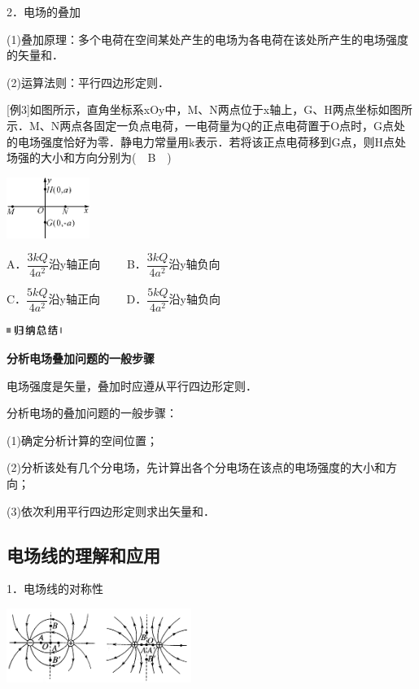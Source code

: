 \documentclass[cn,10.5pt,chinese,mac,chinesefont=founder]{elegantbook}
\begin{document}
2．电场的叠加

(1)叠加原理：多个电荷在空间某处产生的电场为各电荷在该处所产生的电场强度的矢量和．

(2)运算法则：平行四边形定则．

{[}例3{]}如图所示，直角坐标系xOy中，M、N两点位于x轴上，G、H两点坐标如图所示．M、N两点各固定一负点电荷，一电荷量为Q的正点电荷置于O点时，G点处的电场强度恰好为零．静电力常量用k表示．若将该正点电荷移到G点，则H点处场强的大小和方向分别为(　B　)

\begin{center}\includegraphics[width=1.0625in,height=0.78125in]{media/image263.png}\end{center}

A．$\dfrac{3kQ}{4a^2}$沿y轴正向　　 B．$\dfrac{3kQ}{4a^2}$沿y轴负向

C．$\dfrac{5kQ}{4a^2}$沿y轴正向　　 D．$\dfrac{5kQ}{4a^2}$沿y轴负向

\begin{center}\includegraphics[width=0.70833in,height=0.125in]{media/image13.png}

\textbf{分析电场叠加问题的一般步骤}
\end{center}


电场强度是矢量，叠加时应遵从平行四边形定则．

分析电场的叠加问题的一般步骤：

(1)确定分析计算的空间位置；

(2)分析该处有几个分电场，先计算出各个分电场在该点的电场强度的大小和方向；

(3)依次利用平行四边形定则求出矢量和．
\newpage
\subsection{电场线的理解和应用}

1．电场线的对称性

\begin{center}\includegraphics[width=2.36458in,height=0.94792in]{media/image264.png}\end{center}
\end{document}
